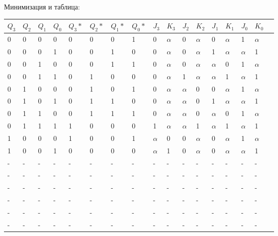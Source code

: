 Минимизация и таблица:
\begin{center}
	\begin{tabular}{ | l | l | l | l | l | l | l | l | l | l | l | l | l | l | l | l | p{1cm} |}
		\hline
		$Q_{3}$ & $Q_{2}$ & $Q_{1}$ & $Q_{0}$ & $Q_{3}*$ & $Q_{2}*$ & $Q_{1}*$ & $Q_{0}*$ & $J_{3}$ & $K_{3}$ & $J_{2}$ & $K_{2}$ & $J_{1}$ & $K_{1}$ & $J_{0}$ & $K_{0}$ \\\hline
		0 & 0 & 0 & 0 & 0 & 0 & 0 & 1 & 0 & $\alpha$ & 0 & $\alpha$ & 0 & $\alpha$ & 1 & $\alpha$ \\\hline
		0 & 0 & 0 & 1 & 0 & 0 & 1 & 0 & 0 & $\alpha$ & 0 & $\alpha$ & 1 & $\alpha$ & $\alpha$ & 1 \\\hline
		0 & 0 & 1 & 0 & 0 & 0 & 1 & 1 & 0 & $\alpha$ & 0 & $\alpha$ & $\alpha$ & 0 & 1 & $\alpha$ \\\hline
		0 & 0 & 1 & 1 & 0 & 1 & 0 & 0 & 0 & $\alpha$ & 1 & $\alpha$ & $\alpha$ & 1 & $\alpha$ & 1 \\\hline
		0 & 1 & 0 & 0 & 0 & 1 & 0 & 1 & 0 & $\alpha$ & $\alpha$ & 0 & 0 & $\alpha$ & 1 & $\alpha$ \\\hline
		0 & 1 & 0 & 1 & 0 & 1 & 1 & 0 & 0 & $\alpha$ & $\alpha$ & 0 & 1 & $\alpha$ & $\alpha$ & 1 \\\hline
		0 & 1 & 1 & 0 & 0 & 1 & 1 & 1 & 0 & $\alpha$ & $\alpha$ & 0 & $\alpha$ & 0 & 1 & $\alpha$ \\\hline
		0 & 1 & 1 & 1 & 1 & 0 & 0 & 0 & 1 & $\alpha$ & $\alpha$ & 1 & $\alpha$ & 1 & $\alpha$ & 1 \\\hline
		1 & 0 & 0 & 0 & 1 & 0 & 0 & 1 & $\alpha$ & 0 & 0 & $\alpha$ & 0 & $\alpha$ & 1 & $\alpha$ \\\hline
		1 & 0 & 0 & 1 & 0 & 0 & 0 & 0 & $\alpha$ & 1 & 0 & $\alpha$ & 0 & $\alpha$ & $\alpha$ & 1 \\\hline
		- & - & - & - & - & - & - & - & - & - & - & - & - & - & - & - \\\hline
		- & - & - & - & - & - & - & - & - & - & - & - & - & - & - & - \\\hline
		- & - & - & - & - & - & - & - & - & - & - & - & - & - & - & - \\\hline
		- & - & - & - & - & - & - & - & - & - & - & - & - & - & - & - \\\hline
		- & - & - & - & - & - & - & - & - & - & - & - & - & - & - & - \\\hline
		- & - & - & - & - & - & - & - & - & - & - & - & - & - & - & - \\
		\hline
	\end{tabular}


\end{center}
